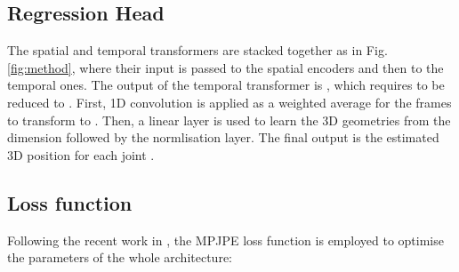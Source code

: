 \documentclass[runningheads]{llncs}
\begin{document}
\subsection{Regression Head}
The spatial and temporal transformers are stacked together as in Fig. \ref{fig:method}, where their input is passed to the spatial encoders and then to the temporal ones. The output of the temporal transformer is , which requires to be reduced to . First, 1D convolution is applied as a weighted average for the frames to transform to . Then, a linear layer is used to learn the 3D geometries from the  dimension followed by the normlisation layer. The final output is the estimated 3D position for each joint .
\subsection{Loss function}
Following the recent work in \cite{pavllo20193d}, the MPJPE loss function is employed to optimise the parameters of the whole architecture:
\vspace{-1em}
\end{document}
